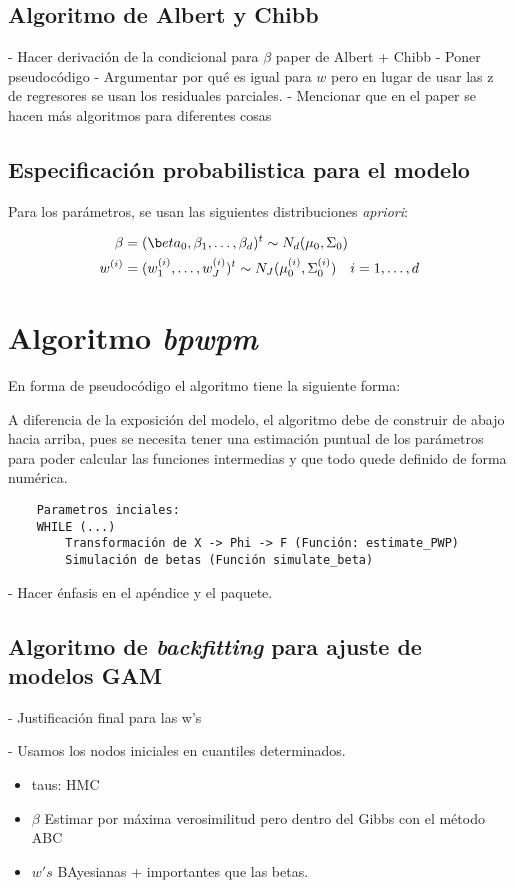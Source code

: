 \documentclass[../Main/Main.tex]{subfiles}
\begin{document}
\subsection{Algoritmo de Albert y Chibb}
- Hacer derivación de la condicional para $\beta$ paper de Albert + Chibb
- Poner pseudocódigo
- Argumentar por qué es igual para $w$ pero en lugar de usar las z de regresores se usan los residuales parciales.
- Mencionar que en el paper se hacen más algoritmos para diferentes cosas

\subsection{Especificación probabilistica para el modelo}
Para los parámetros, se usan las siguientes distribuciones \textit{apriori}:

\begin{align}
	\mathbf{\beta} &= (\b	eta_0,\beta_1,\ldots,\beta_d)^t \sim N_d(\mu_0, \Sigma_0) \\
	w\superi &= (w\superi_1,\ldots,w\superi_J)^t \sim N_J(\mu\superi_0,\Sigma\superi_0) \quad i=1,\ldots,d
\end{align}

\section{Algoritmo \textit{bpwpm}}
En forma de pseudocódigo el algoritmo tiene la siguiente forma:

A diferencia de la exposición del modelo, el algoritmo debe de construir de abajo hacia arriba, pues se necesita tener una estimación puntual de los parámetros para poder calcular las funciones intermedias y que todo quede definido de forma numérica. 

\begin{verbatim}
    Parametros inciales: 
    WHILE (...)
        Transformación de X -> Phi -> F (Función: estimate_PWP)		
        Simulación de betas (Función simulate_beta)
\end{verbatim} 

- Hacer énfasis en el apéndice y el paquete.

\subsection{Algoritmo de \textit{backfitting} para ajuste de modelos GAM} 
- Justificación final para las w's

- Usamos los nodos iniciales en cuantiles determinados.\\
\begin{itemize}
\item taus: HMC
\item $\beta$ Estimar por máxima verosimilitud pero dentro del Gibbs con el método ABC
\item $w's$ BAyesianas + importantes que las betas.
\end{itemize}
\end{document}
